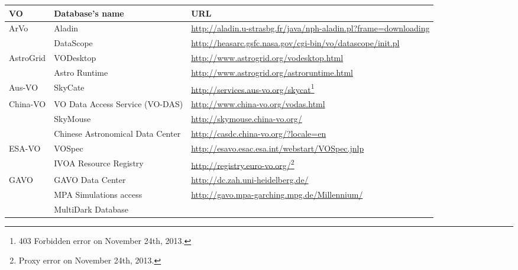 \onecolumn
\scriptsize
\begin{longtable}{|m{2cm}|m{4.5cm}|m{7.5cm}|}
    \hline
    \textbf{VO} & \textbf{Database's name} & \textbf{URL} \\
    \hline
    \multirow{2}{*}{ArVo} & Aladin
    & \url{http://aladin.u-strasbg.fr/java/nph-aladin.pl?frame=downloading} \\
    \cline{2-3}
     & DataScope
     & \url{http://heasarc.gsfc.nasa.gov/cgi-bin/vo/datascope/init.pl} \\
     \hline
    \multirow{2}{*}{AstroGrid} & VODesktop
    & \url{http://www.astrogrid.org/vodesktop.html}\\
    \cline{2-3}
     & Astro Runtime & \url{http://www.astrogrid.org/astroruntime.html} \\
     \hline
    Aus-VO & SkyCate
    & \url{http://services.aus-vo.org/skycat}\footnote{403 Forbidden error on November 24th, 2013.} \\ 
    \hline
    \multirow{3}{*}{China-VO} & VO Data Access Service (VO-DAS)
    & \url{http://www.china-vo.org/vodas.html} \\
    \cline{2-3}
     & SkyMouse & \url{http://skymouse.china-vo.org/} \\
     \cline{2-3}
     & Chinese Astronomical Data Center 
     & \url{http://casdc.china-vo.org/?locale=en} \\
     \hline
    \multirow{2}{*}{ESA-VO} & VOSpec
    & \url{http://esavo.esac.esa.int/webstart/VOSpec.jnlp} \\
     \cline{2-3}
     & IVOA Resource Registry
     & \url{http://registry.euro-vo.org/}\footnote{Proxy error on November 24th, 2013.} \\
     \hline
    \multirow{5}{*}{GAVO} & GAVO Data Center
    & \url{http://dc.zah.uni-heidelberg.de/} \\
    \cline{2-3}
     & MPA Simulations access
     & \url{http://gavo.mpa-garching.mpg.de/Millennium/} \\
     \cline{2-3}
     & MultiDark Database

\end{longtable}
